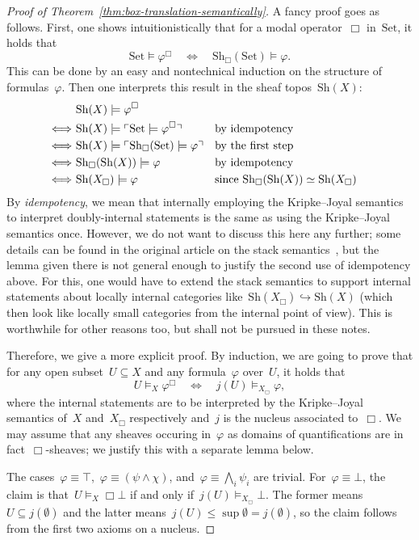 \documentclass[10pt]{amsart}
\theoremstyle{definition}
\theoremstyle{plain}
\theoremstyle{remark}
\newcommand{\Set}{\mathrm{Set}}
\newcommand{\Sh}{\mathrm{Sh}}
\newcommand{\?}{\,{:}\,}
\renewcommand{\_}{\mathpunct{.}\,}
\newcommand{\speak}[1]{\ulcorner\text{\textnormal{#1}}\urcorner}
\begin{document}
\begin{proof}[Proof of Theorem~\ref{thm:box-translation-semantically}]
A fancy proof goes as follows. First, one shows intuitionistically that for a
modal operator~$\Box$ in~$\Set$, it holds that
\[ \Set \models \varphi^\Box \quad\Longleftrightarrow\quad
  \Sh_\Box(\Set) \models \varphi. \]
This can be done by an easy and nontechnical induction on the structure of
formulas~$\varphi$. Then one interprets this result in the sheaf topos~$\Sh(X)$:
\begin{align*}
  &\ \Sh(X) \models \varphi^\Box \\
  \Longleftrightarrow&\
  \Sh(X) \models \speak{$\Set \models \varphi^\Box$} &&\text{by idempotency}\\
  \Longleftrightarrow&\
  \Sh(X) \models \speak{$\Sh_\Box(\Set) \models \varphi$} &&\text{by the first step} \\
  \Longleftrightarrow&\
  \Sh_\Box(\Sh(X)) \models \varphi &&\text{by idempotency} \\
  \Longleftrightarrow&\
  \Sh(X_\Box) \models \varphi &&\text{since~$\Sh_\Box(\Sh(X)) \simeq
  \Sh(X_\Box)$}
\end{align*}
By \emph{idempotency}, we mean that internally employing the Kripke--Joyal
semantics to interpret doubly-internal statements is the same as using the
Kripke--Joyal semantics once. However, we do not want to discuss this here any further;
some details can be found in the original article on the stack
semantics~\cite[Lemma~7.20]{shulman:stack}, but the lemma given there is not
general enough to justify the second use of idempotency above. For this, one
would have to extend the stack semantics to support internal statements about
locally internal categories like~$\Sh(X_\Box) \hookrightarrow \Sh(X)$ (which
then look like locally small categories from the internal point of view). This
is worthwhile for other reasons too, but shall not be pursued in these notes.

Therefore, we give a more explicit proof. By induction, we are going to prove
that for any open subset~$U \subseteq X$ and any formula~$\varphi$ over~$U$, it
holds that
\[ U \models_X \varphi^\Box \quad\Longleftrightarrow\quad j(U) \models_{X_\Box}
\varphi, \]
where the internal statements are to be interpreted by the Kripke--Joyal
semantics of~$X$ and~$X_\Box$ respectively and~$j$ is the nucleus associated
to~$\Box$. We may assume that any sheaves occuring in~$\varphi$ as domains of
quantifications are in fact~$\Box$-sheaves; we justify this with a separate lemma
below.

The cases~$\varphi \equiv \top$,~$\varphi \equiv (\psi \wedge \chi)$,
and~$\varphi \equiv \bigwedge_i \psi_i$ are trivial. For~$\varphi \equiv \bot$,
the claim is that~$U \models_X \Box\bot$ if and only if~$j(U)
\models_{X_\Box} \bot$. The former means~$U \subseteq j(\emptyset)$ and the
latter means~$j(U) \leq \sup \emptyset = j(\emptyset)$, so the claim follows from
the first two axioms on a nucleus.
\end{proof}
\end{document}
